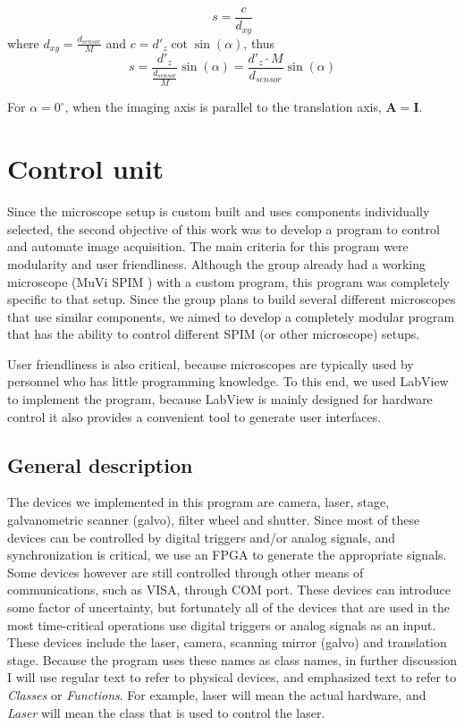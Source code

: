 \documentclass{diploma_style}
\begin{document}
\begin{equation}
s = \frac{c}{d_{xy}}
\end{equation}
where $d_{xy} = \frac{d_{sensor}}{M}$ and $c=d'_z\cot \sin(\alpha)$, thus
\begin{equation}
s = \frac{d'_z}{\frac{d_{sensor}}{M}} \sin(\alpha) = \frac{d'_z \cdot M}{d_{sensor}} \sin(\alpha)
\end{equation}

For $\alpha = 0^\circ$, when the imaging axis is parallel to the translation axis, $\mathbf{A=I}$.


\chapter{Control unit}
\label{chap3}

Since the microscope setup is custom built and uses components individually selected, the second objective of this work was to develop a program to control and automate image acquisition. The main criteria for this program were modularity and user friendliness. Although the group already had a working microscope (MuVi SPIM \cite{krzic_multiview_2012}) with a custom program, this program was completely specific to that setup. Since the group plans to build several different microscopes that use similar components, we aimed to develop a completely modular program that has the ability to control different SPIM (or other microscope) setups.

User friendliness is also critical, because microscopes are typically used by personnel who has little programming knowledge. To this end, we used LabView to implement the program, because LabView is mainly designed for hardware control it also provides a convenient tool to generate user interfaces.


\section{General description}
The devices we implemented in this program are camera, laser, stage, galvanometric scanner (galvo), filter wheel and shutter. Since most of these devices can be controlled by digital triggers and/or analog signals, and  synchronization is critical, we use an FPGA to generate the appropriate signals. Some devices however are still controlled through other means of communications, such as VISA, through COM port. These devices can introduce some factor of uncertainty, but fortunately all of the devices that are used in the most time-critical operations use digital triggers or analog signals as an input. These devices include the laser, camera, scanning mirror (galvo) and translation stage. Because the program uses these names as class names, in further discussion I will use regular text to refer to physical devices, and emphasized text to refer to \emph{Classes} or \emph{Functions}. For example, laser will mean the actual hardware, and \emph{Laser} will mean the class that is used to control the laser.
\end{document}
